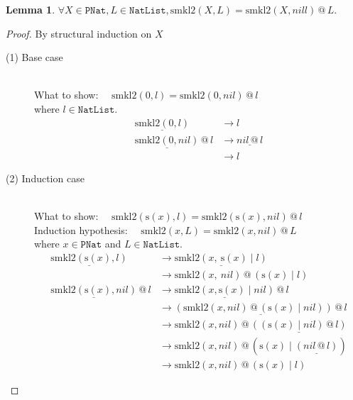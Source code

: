 \documentclass[12pt, a4paper]{article}
\newtheorem{lemma}[theorem]{Lemma}
\newcommand{\rel}[1]{\mathrel{#1}}
\newcommand{\rmx}[1]{\mathrm{#1}}
\newcommand{\larrow}{\longrightarrow}
\newcommand{\under}{\underline}
\begin{document}
\begin{lemma}
\label{lm2}
$\forall X \in \mathtt{PNat}, L \in \mathtt{NatList}, \rmx{smkl2}(X, L) = \rmx{smkl2}(X, nill) \rel{@} L .$
\end{lemma}
\begin{proof}
By structural induction on $X$

\begin{description}

\item[(1) Base case]~\\
\noindent
What to show: $\quad\rmx{smkl2}(0, l) = \rmx{smkl2}(0, nil) \rel{@} l$ \\
where $l \in \mathtt{NatList}$.
\begin{align*}
\under{\rmx{smkl2}(0, l)}
	&\larrow l \tag{by smkl2-1} \\
\under{\rmx{smkl2}(0, nil)} \rel{@} l 
	&\larrow \under{nil \rel{@} l} \tag{by smkl2-1} \\
	&\larrow l \tag{by @1}
\end{align*}

\item[(2) Induction case]~\\
What to show: $\quad\rmx{smkl2}(\rmx{s}(x), l) = \rmx{smkl2}(\rmx{s}(x), nil) \rel{@} l$ \\
Induction hypothesis: $\quad\rmx{smkl2}(x, L) = \rmx{smkl2}(x, nil) \rel{@} L$ \\
where $x \in \mathtt{PNat}$ and $L \in \mathtt{NatList}$.
\begin{align*}
\under{\rmx{smkl2}(\rmx{s}(x), l)} 
	&\larrow \under{\rmx{smkl2}(x,\ \rmx{s}(x) \rel{|} l)} \tag{by smkl2-2} \\
	&\larrow \rmx{smkl2}(x,\ nil) \rel{@} (\rmx{s}(x) \rel{|} l) \tag{by IH} \\
\under{\rmx{smkl2}(\rmx{s}(x), nil)} \rel{@} l
	&\larrow \under{\rmx{smkl2}(x, \rmx{s}(x) \rel{|} nil)} \rel{@} l \tag{smkl2-2} \\
	&\larrow \under{(\rmx{smkl2}(x, nil) \rel{@} (\rmx{s}(x) \rel{|} nil)) \rel{@} l} \tag{by IH} \\
	&\larrow \rmx{smkl2}(x, nil) \rel{@} \under{((\rmx{s}(x) \rel{|} nil) \rel{@} l)} \tag{by assoc@} \\
	&\larrow \rmx{smkl2}(x, nil) \rel{@} (\rmx{s}(x) \rel{|} \under{(nil \rel{@} l)}) \tag{by @2} \\
	&\larrow \rmx{smkl2}(x, nil) \rel{@} (\rmx{s}(x) \rel{|} l) \tag{by @1}
\end{align*}

\end{description}
\end{proof}
\end{document}
